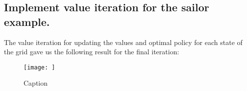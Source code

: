 \documentclass[12pt]{article}
\begin{document}
\subsection{Implement value iteration for the sailor example.}

The value iteration for updating the values and optimal policy for each state of the grid gave us the following result for the final iteration:

\begin{figure}
    \centering
    \texttt{[image: ]}
    \caption{Caption}
    \label{fig:my_label}
\end{figure}


\end{document}
